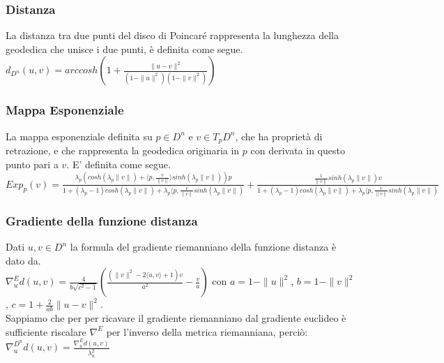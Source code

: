 \documentclass[a4paper, 12pt]{article}
\begin{document}
\subsubsection{Distanza}
La distanza tra due punti del disco di Poincaré rappresenta la lunghezza della geodedica che unisce i due punti, è definita come segue.\\
$d_{D^n}(u, v) = arccosh(1 + \frac{\parallel u - v\parallel^2}{(1-\parallel u \parallel^2)(1-\parallel v \parallel^2)})$
\subsubsection{Mappa Esponenziale}
La mappa esponenziale definita su $p \in D^n$ e $v \in T_pD^n$, che ha proprietà di retrazione, e che rappresenta la geodedica originaria in $p$ con derivata in questo punto pari a $v$. E' definita come segue.\\
$Exp_p(v) = \frac{\lambda_p (cosh(\lambda_p \parallel v \parallel) + \langle p,\frac{v}{\parallel v \parallel} \rangle sinh(\lambda_p \parallel v \parallel))p}{1 + (\lambda_p - 1) cosh(\lambda_p \parallel v \parallel) + \lambda_p \langle p, \frac{v}{\parallel v \parallel} sinh(\lambda_p \parallel v \parallel)} + \frac{\frac{1}{\parallel v \parallel} sinh(\lambda_p \parallel v \parallel) v}{1 + (\lambda_p - 1) cosh(\lambda_p \parallel v \parallel) + \lambda_p \langle p, \frac{v}{\parallel v \parallel} sinh(\lambda_p \parallel v \parallel)}$
\subsubsection{Gradiente della funzione distanza}
Dati $u,v \in D^n$ la formula del gradiente riemanniano della funzione distanza è dato da.\\
$\nabla_u^{E} d(u,v) = \frac{4}{b \sqrt{c^2 - 1}} (\frac{(\parallel v \parallel^2 - 2\langle u,v \rangle + 1)v}{a^2} - \frac{v}{a})$ con $a = 1 - \parallel u \parallel^2$, $b = 1 - \parallel v \parallel^2$, $c = 1 + \frac{2}{ab} \parallel u - v \parallel^2$.\\
Sappiamo che per per ricavare il gradiente riemanniano dal gradiente euclideo è sufficiente riscalare $\nabla^E$ per l'inverso della metrica riemanniana, perciò: $\nabla_u^{D^n} d(u,v) = \frac{\nabla_u^{E} d(u,v)}{\lambda_u^2}$
\end{document}
